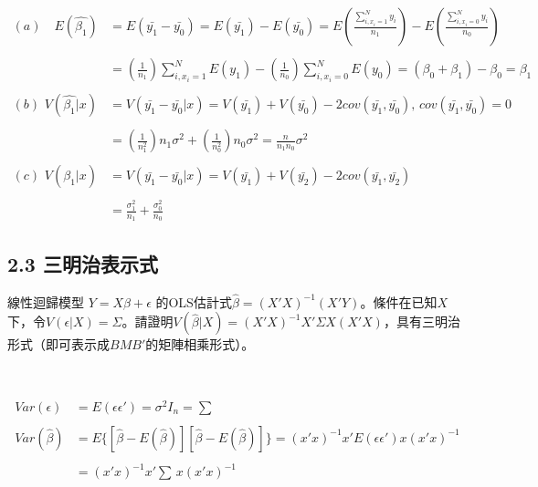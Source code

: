 \documentclass[]{article}
\begin{document}
\begin{align}
(a)\,\,\,\,\,\,E(\hat{\beta_1})&=E(\bar{y_1}-\bar{y_0})=E(\bar{y_1})-E(\bar{y_0})=E(\frac{\sum_{i,x_i=1}^Ny_i}{n_1})-E(\frac{\sum_{i,x_i=0}^Ny_i}{n_0})\\
\\
&=(\frac{1}{n_1})\sum_{i,x_i=1}^N E(y_1)-(\frac{1}{n_0})\sum_{i,x_i=0}^N E(y_0)=(\beta_0+\beta_1)-\beta_0=\beta_1\\
\\
(b)\,\,V(\hat{\beta_1}|x)&=V(\bar{y_1}-\bar{y_0}|x)=V(\bar{y_1})+V(\bar{y_0})-2cov(\bar{y_1},\bar{y_0}),\,cov(\bar{y_1},\bar{y_0})=0 \\
\\
&=(\frac{1}{n_1^2})n_1\sigma^2+(\frac{1}{n_0^2})n_0\sigma^2=\frac{n}{n_1n_0}\sigma^2\\
\\
(c)\,\,V(\hat{\beta_1}|x)&=V(\bar{y_1}-\bar{y_0}|x)=V(\bar{y_1})+V(\bar{y_2})-2cov(\bar{y_1},\bar{y_2})\\
\\
&=\frac{\sigma_1^2}{n_1}+\frac{\sigma_0^2}{n_0}
\end{align}

\subsection{2.3 三明治表示式}

線性迴歸模型 \(Y=X\beta+\epsilon\)
的OLS估計式\(\hat{\beta}=(X'X)^{-1}(X'Y)\)。條件在已知\(X\)下，令\(V(\epsilon|X)=\Sigma\)。請證明\(V(\hat{\beta}|X)=(X'X)^{-1}X'\Sigma X (X'X)\)，具有三明治形式（即可表示成\(BMB'\)的矩陣相乘形式）。

~

\begin{align}
Var(\epsilon)&=E(\epsilon\epsilon')=\sigma^2I_n=\sum\\
\\
Var(\hat{\beta})&=E\{[\hat{\beta}-E(\hat{\beta})][\hat{\beta}-E(\hat{\beta})]\}=(x'x)^{-1}x'E(\epsilon\epsilon')x(x'x)^{-1}\\
\\
&=(x'x)^{-1}x'\sum\,x(x'x)^{-1}
\end{align}
\end{document}
